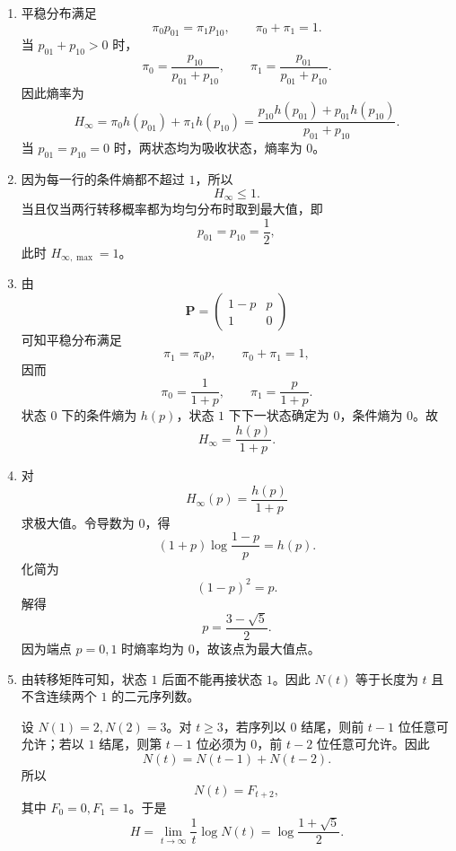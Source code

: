 \documentclass[UTF8,11pt,a4paper]{ctexart}
\begin{document}
\begin{enumerate}[label=\textnormal{(\alph*)}]
  \item 平稳分布满足
  \[
  \pi_0p_{01}=\pi_1p_{10},\qquad \pi_0+\pi_1=1.
  \]
  当 $p_{01}+p_{10}>0$ 时，
  \[
  \pi_0=\frac{p_{10}}{p_{01}+p_{10}},\qquad
  \pi_1=\frac{p_{01}}{p_{01}+p_{10}}.
  \]
  因此熵率为
  \[
  H_\infty
  =\pi_0 h(p_{01})+\pi_1 h(p_{10})
  =\frac{p_{10}h(p_{01})+p_{01}h(p_{10})}{p_{01}+p_{10}}.
  \]
  当 $p_{01}=p_{10}=0$ 时，两状态均为吸收状态，熵率为 $0$。

  \item 因为每一行的条件熵都不超过 $1$，所以
  \[
  H_\infty\le 1.
  \]
  当且仅当两行转移概率都为均匀分布时取到最大值，即
  \[
  p_{01}=p_{10}=\frac12,
  \]
  此时 $H_{\infty,\max}=1$。

  \item 由
  \[
  \boldsymbol{P} =
  \begin{pmatrix}
  1-p & p\\
  1 & 0
  \end{pmatrix}
  \]
  可知平稳分布满足
  \[
  \pi_1=\pi_0p,\qquad \pi_0+\pi_1=1,
  \]
  因而
  \[
  \pi_0=\frac{1}{1+p},\qquad \pi_1=\frac{p}{1+p}.
  \]
  状态 $0$ 下的条件熵为 $h(p)$，状态 $1$ 下下一状态确定为 $0$，条件熵为 $0$。故
  \[
  H_\infty=\frac{h(p)}{1+p}.
  \]

  \item 对
  \[
  H_\infty(p)=\frac{h(p)}{1+p}
  \]
  求极大值。令导数为 $0$，得
  \[
  (1+p)\log\frac{1-p}{p}=h(p).
  \]
  化简为
  \[
  (1-p)^2=p.
  \]
  解得
  \[
  p=\frac{3-\sqrt5}{2}.
  \]
  因为端点 $p=0,1$ 时熵率均为 $0$，故该点为最大值点。

  \item 由转移矩阵可知，状态 $1$ 后面不能再接状态 $1$。因此 $N(t)$ 等于长度为 $t$ 且不含连续两个 $1$ 的二元序列数。

  设 $N(1)=2,N(2)=3$。对 $t\ge 3$，若序列以 $0$ 结尾，则前 $t-1$ 位任意可允许；若以 $1$ 结尾，则第 $t-1$ 位必须为 $0$，前 $t-2$ 位任意可允许。因此
  \[
  N(t)=N(t-1)+N(t-2).
  \]
  所以
  \[
  N(t)=F_{t+2},
  \]
  其中 $F_0=0,F_1=1$。于是
  \[
  H=\lim_{t\to\infty}\frac1t\log N(t)
  =\log\frac{1+\sqrt5}{2}.
  \]
\end{enumerate}
\end{document}
